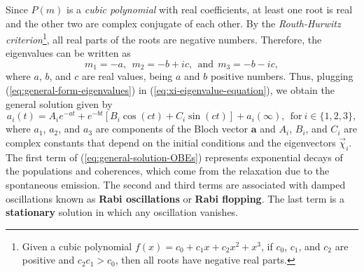 Since $ P(m) $ is a \textit{cubic polynomial} with real coefficients, at least one root is real and the other two are complex conjugate of each other. By the \textit{Routh-Hurwitz criterion}\footnote{Given a cubic polynomial $f(x) = c_0 + c_1 x + c_2 x^2 + x^3 $, if $ c_0 $, $ c_1 $, and $ c_2 $ are positive and $ c_2c_1 > c_0 $, then all roots have negative real parts.}, all real parts of the roots are negative numbers. Therefore, the eigenvalues can be written as
\begin{equation}
	m_1 = -a,\ \ m_2 = -b + ic,\ \ \textrm{and}\ \ m_3 = -b - ic,
	\label{eq:general-form-eigenvalues}
\end{equation}
where $ a $, $ b $, and $ c $ are real values, being $ a $ and $ b $ positive numbers. Thus, plugging (\ref{eq:general-form-eigenvalues}) in (\ref{eq:xi-eigenvalue-equation}), we obtain the general solution given by
\begin{equation}
	a_{i}(t) = A_i e^{-at} + e^{-b t}[B_i \cos(ct) + C_i \sin(ct)] + a_i(\infty),\ \ \textrm{for}\ i \in \{1,2,3\},
	\label{eq:general-solution-OBEs}
\end{equation}
where $ a_1 $, $ a_2 $, and $ a_3 $ are components of the Bloch vector $ \mathbf{a} $ and $ A_i $, $ B_i $, and $ C_i $ are complex constants that depend on the initial conditions and the eigenvectors $ \vec{\chi}_i $. The first term of (\ref{eq:general-solution-OBEs}) represents exponential decays of the populations and coherences, which come from the relaxation due to the spontaneous emission. The second and third terms are associated with damped oscillations known as \textbf{Rabi oscillations} or \textbf{Rabi flopping}. The last term is a \textbf{stationary} solution in which any oscillation vanishes.

